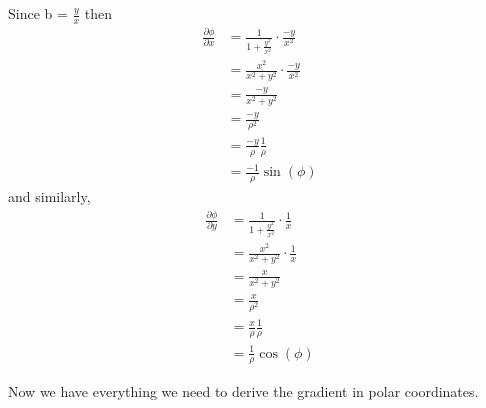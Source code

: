 \documentclass[11pt]{article}
\begin{document}
Since b = \(\frac{y}{x}\) then \begin{equation} \label{eq13314}
\begin{split}
\frac{\partial \phi}{\partial x} & = \frac{1}{1 + \frac{y^2}{x^2}} \cdot \frac{-y}{x^2} \\ & = \frac{x^2}{x^2 + y^2}\cdot \frac{-y}{x^2} \\ & = \frac{-y}{x^2 + y^2} \\ & = \frac{-y}{\rho^2} \\ & = \frac{-y}{\rho}\frac{1}{\rho} \\ & = \frac{-1}{\rho}\sin(\phi)
\end{split}
\end{equation} and similarly, \begin{equation} \label{eq13315}
\begin{split}
\frac{\partial \phi}{\partial y} & = \frac{1}{1 + \frac{y^2}{x^2}} \cdot \frac{1}{x} \\ & = \frac{x^2}{x^2 + y^2}\cdot \frac{1}{x} \\ & = \frac{x}{x^2 + y^2} \\ & = \frac{x}{\rho^2} \\ & = \frac{x}{\rho}\frac{1}{\rho} \\ & = \frac{1}{\rho}\cos(\phi)
\end{split}
\end{equation}

Now we have everything we need to derive the gradient in polar
coordinates.
\end{document}
